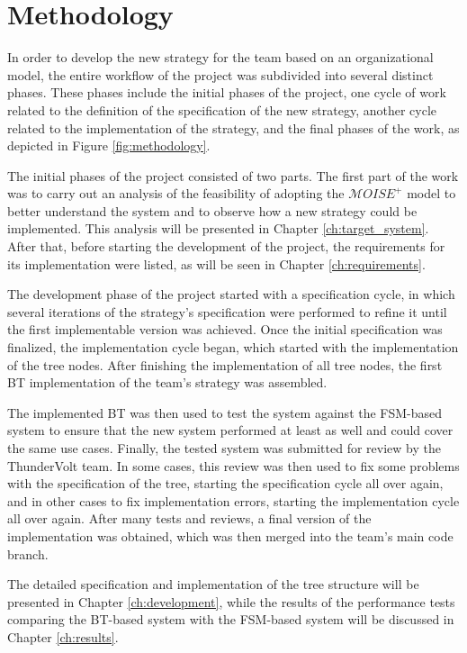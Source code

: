 \def \MOISEp {$\mathcal{M}OISE^+$ } 

\chapter{Methodology}
\label{ch:methodology}

In order to develop the new strategy for the team based on an organizational model, the entire workflow of the project was subdivided into several distinct phases. These phases include the initial phases of the project, one cycle of work related to the definition of the specification of the new strategy, another cycle related to the implementation of the strategy, and the final phases of the work, as depicted in Figure \ref{fig:methodology}.

The initial phases of the project consisted of two parts. The first part of the work was to carry out an analysis of the feasibility of adopting the \MOISEp model to better understand the system and to observe how a new strategy could be implemented. This analysis will be presented in Chapter \ref{ch:target_system}. After that, before starting the development of the project, the requirements for its implementation were listed, as will be seen in Chapter \ref{ch:requirements}.

The development phase of the project started with a specification cycle, in which several iterations of the strategy's specification were performed to refine it until the first implementable version was achieved. Once the initial specification was finalized, the implementation cycle began, which started with the implementation of the tree nodes. After finishing the implementation of all tree nodes, the first BT implementation of the team's strategy was assembled. 

The implemented BT was then used to test the system against the FSM-based system to ensure that the new system performed at least as well and could cover the same use cases. Finally, the tested system was submitted for review by the ThunderVolt team. In some cases, this review was then used to fix some problems with the specification of the tree, starting the specification cycle all over again, and in other cases to fix implementation errors, starting the implementation cycle all over again. After many tests and reviews, a final version of the implementation was obtained, which was then merged into the team's main code branch. 

The detailed specification and implementation of the tree structure will be presented in Chapter \ref{ch:development}, while the results of the performance tests comparing the BT-based system with the FSM-based system will be discussed in Chapter \ref{ch:results}.

